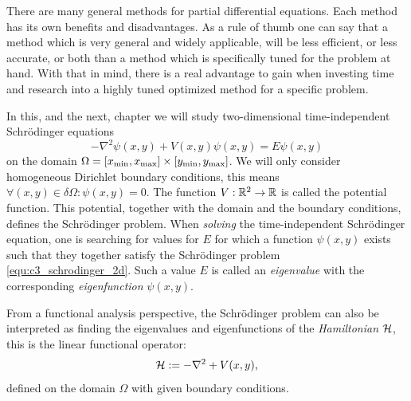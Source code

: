 


\label{cha:c3}

There are many general methods for partial differential equations. Each method has its own benefits and disadvantages. As a rule of thumb one can say that a method which is very general and widely applicable, will be less efficient, or less accurate, or both than a method which is specifically tuned for the problem at hand. With that in mind, there is a real advantage to gain when investing time and research into a highly tuned optimized method for a specific problem.

In this, and the next, chapter we will study two-dimensional time-independent Schrödinger equations
\begin{equation}\label{equ:c3_schrodinger_2d}
    -\nabla^2\psi(x, y) + V(x, y) \psi(x, y) = E \psi(x, y)
\end{equation}
on the domain $\Omega = [{x_{\text{min}}}, {x_{\text{max}}}]\times[{y_{\text{min}}}, {y_{\text{max}}}]$. We will only consider homogeneous Dirichlet boundary conditions, this means $\forall (x, y) \in \delta\Omega : \psi(x, y) = 0$. The function $V: \mathbb{R}^2 \to \mathbb{R}$ is called the potential function. This potential, together with the domain and the boundary conditions, defines the Schrödinger problem. When \emph{solving} the time-independent Schrödinger equation, one is searching for values for $E$ for which a function $\psi(x, y)$  exists such that they together satisfy the Schrödinger problem \eqref{equ:c3_schrodinger_2d}. Such a value $E$ is called an \emph{eigenvalue} with the corresponding \emph{eigenfunction} $\psi(x, y)$.

From a functional analysis perspective, the Schrödinger problem can also be interpreted as finding the eigenvalues and eigenfunctions of the \emph{Hamiltonian} $\mathcal{H}$, this is the linear functional operator:
$$
    \mathcal{H} := -\nabla^2 + V(x, y)\text{,}
$$
defined on the domain $\Omega$ with given boundary conditions.

